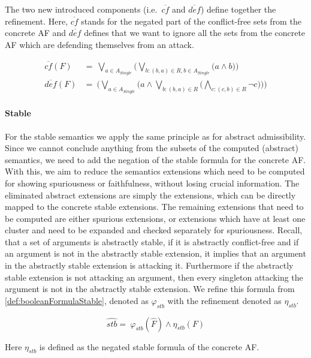 The two new introduced components (i.e.\ $\overline{cf}$ and $\overline{def}$) define together the refinement. Here, $\overline{cf}$ stands for the negated part of the conflict-free sets from the concrete AF and $\overline{def}$ defines that we want to ignore all the sets from the concrete AF which are defending themselves from an attack.

\begin{align*}
    \overline{cf}(F)&=\ \bigvee_{a \in A_{\mathit{Single}}} \big( \bigvee_{b:(b,a)\in R, b \in A_{\mathit{Single}}} \big( a \land b \big) \big)\\
    \overline{def}(F)&=\ \big( \bigvee_{a \in A_{\mathit{Single}}}\big( a \land \bigvee_{b:(b,a)\in R} \big( \bigwedge_{c:(c, b)\in R} \lnot c\big)\big) \big)
\end{align*}

\paragraph{Stable} For the stable semantics we apply the same principle as for abstract admissibility. Since we cannot conclude anything from the subsets of the computed (abstract) semantics, we need to add the negation of the stable formula for the concrete AF. With this, we aim to reduce the semantics extensions which need to be computed for showing spuriousness or faithfulness, without losing crucial information. The eliminated abstract extensions are simply the extensions, which can be directly mapped to the concrete stable extensions. The remaining extensions that need to be computed are either spurious extensions, or extensions which have at least one cluster and need to be expanded and checked separately for spuriousness. Recall, that a set of
arguments is abstractly stable, if it is abstractly conflict-free and if an argument is not in the abstractly stable extension, it implies that an argument in the abstractly stable extension is attacking it. Furthermore if the abstractly stable extension is not attacking an argument, then every singleton attacking the argument is not in the abstractly stable extension. We refine this formula from \cref{def:booleanFormulaStable}, denoted as $\varphi_{stb}$ with the refinement denoted as $\eta_{stb}$.


$$ \hat{stb}=\  \varphi_{stb}(\hat{F}) \land \eta_{stb}(F) $$

\vspace{0.04cm}
Here $\eta_{stb}$ is defined as the negated stable formula of the concrete AF.
\vspace{0.01cm}



